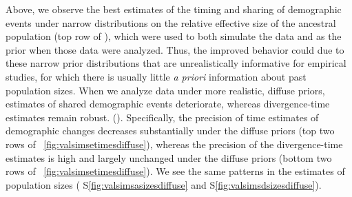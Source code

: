 Above, we observe the best estimates of the timing and sharing of demographic
events under narrow distributions on the relative effective size of the
ancestral population
(top row of \figs
{}),
which were used to both simulate the data and as the prior
when those data were analyzed.
Thus, the improved behavior could due to these narrow prior distributions that
are unrealistically informative for empirical studies, for which there is
usually little \emph{a priori} information about past population sizes.
When we analyze data under more realistic, diffuse priors, estimates of shared
demographic events deteriorate, whereas divergence-time estimates remain
robust.
(\figs {}).
Specifically, the precision of time estimates of demographic changes decreases
substantially under the diffuse priors
(top two rows of \fig{}~\ref{fig:valsimsetimesdiffuse}),
whereas the precision of the divergence-time estimates
is high and largely unchanged under the diffuse priors
(bottom two rows of \fig{}~\ref{fig:valsimsetimesdiffuse}).
We see the same patterns in the estimates of population sizes
(\figs
S\ref{fig:valsimsasizesdiffuse}
and
S\ref{fig:valsimsdsizesdiffuse}).

